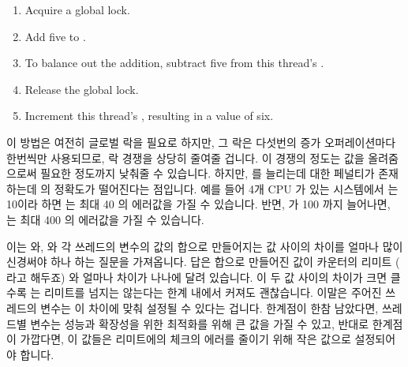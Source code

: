 \begin{lineref}
\begin{enumerate}
\item	Acquire a global lock.
\item	Add five to .
\item	To balance out the addition, subtract five from this
	thread's .
\item	Release the global lock.
\item	Increment this thread's , resulting in a value of six.
\fi
\end{enumerate}

이 방법은 여전히 글로벌 락을 필요로 하지만, 그 락은 다섯번의 증가
오퍼레이션마다 한번씩만 사용되므로, 락 경쟁을 상당히 줄여줄 겁니다.
이 경쟁의 정도는  값을 올려줌으로써 필요한 정도까지 낮춰줄 수
있습니다.
하지만,  를 늘리는데 대한 페널티가 존재하는데 
의 정확도가 떨어진다는 점입니다.
예를 들어 4개 CPU 가 있는 시스템에서  는 10이라 하면
 는 최대 40 의 에러값을 가질 수 있습니다.
반면,  가 100 까지 늘어나면,  는 최대 400 의
에러값을 가질 수 있습니다.

이는  와,  와 각 쓰레드의  변수의
값의 합으로 만들어지는 값 사이의 차이를 얼마나 많이 신경써야 하나 하는 질문을
가져옵니다.
답은 합으로 만들어진 값이 카운터의 리미트 ( 라고 해두죠) 와
얼마나 차이가 나나에 달려 있습니다.
이 두 값 사이의 차이가 크면 클수록  는 
리미트를 넘지는 않는다는 한계 내에서 커져도 괜찮습니다.
이말은 주어진 쓰레드의  변수는 이 차이에 맞춰 설정될 수 있다는
겁니다.
한계점이 한참 남았다면,  쓰레드별 변수는 성능과 확장성을 위한
최적화를 위해 큰 값을 가질 수 있고, 반대로 한계점이 가깝다면, 이 값들은
 리미트에의 체크의 에러를 줄이기 위해 작은 값으로 설정되어야
합니다.
\iffalse


\end{lineref}
